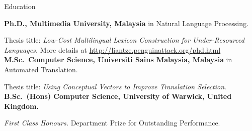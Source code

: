 \begin{rubric}{Education}

\entry*[2009 -- 2013]%
	\textbf{Ph.D., Multimedia University, Malaysia} in Natural Language Processing.
	\par Thesis title: \emph{Low-Cost Multilingual Lexicon Construction for Under-Resourced Languages.} More details at \url{http://liantze.penguinattack.org/phd.html}
%
\entry*[2003 -- 2006]%
	\textbf{M.Sc.~Computer Science, Universiti Sains Malaysia, Malaysia} in Automated Translation.\par
	Thesis title: \emph{Using Conceptual Vectors to Improve Translation Selection}.
%
\entry*[1998 -- 2001]%
	\textbf{B.Sc.~(Hons) Computer Science, University of Warwick, United Kingdom.}\par
	\emph{First Class Honours.}  Department Prize for Outstanding Performance.
\end{rubric}